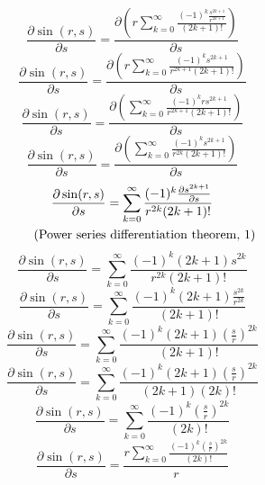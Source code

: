 \documentclass[a4paper,12pt]{report}
\newcommand{\equationnote}[1]{%
    \refstepcounter{equation}%
    \tag{#1, \theequation}%
}
\begin{document}
\begin{equation}
\frac{\partial \sin(r,s)}{\partial s} = \frac{\partial \left(r \sum \limits_{k=0}^{\infty} \frac{(-1)^k \frac{s^{2k+1}}{r^{2k+1}}}{(2k+1)!}\right)}{\partial s}
\end{equation}
\begin{equation}
\frac{\partial \sin(r,s)}{\partial s} = \frac{\partial \left(r \sum \limits_{k=0}^{\infty} \frac{(-1)^k s^{2k+1}}{r^{2k+1} (2k+1)!}\right)}{\partial s}
\end{equation}
\begin{equation}
\frac{\partial \sin(r,s)}{\partial s} = \frac{\partial \left(\sum \limits_{k=0}^{\infty} \frac{(-1)^k rs^{2k+1}}{r^{2k+1} (2k+1)!}\right)}{\partial s}
\end{equation}
\begin{equation}
\frac{\partial \sin(r,s)}{\partial s} = \frac{\partial \left(\sum \limits_{k=0}^{\infty} \frac{(-1)^k s^{2k+1}}{r^{2k} (2k+1)!}\right)}{\partial s}
\end{equation}
\begin{gather}
\frac{\partial \sin(r,s)}{\partial s} = \sum \limits_{k=0}^{\infty} \frac{(-1)^k \frac{\partial s^{2k+1}}{\partial s}}{r^{2k} (2k+1)!} \notag \\
\equationnote{Power series differentiation theorem}
\end{gather}
\begin{equation}
\frac{\partial \sin(r,s)}{\partial s} = \sum \limits_{k=0}^{\infty} \frac{(-1)^k (2k+1) s^{2k}}{r^{2k} (2k+1)!}
\end{equation}
\begin{equation}
\frac{\partial \sin(r,s)}{\partial s} = \sum \limits_{k=0}^{\infty} \frac{(-1)^k (2k+1) \frac{s^{2k}}{r^{2k}}}{(2k+1)!}
\end{equation}
\begin{equation}
\frac{\partial \sin(r,s)}{\partial s} = \sum \limits_{k=0}^{\infty} \frac{(-1)^k (2k+1) \left(\frac{s}{r}\right)^{2k}}{(2k+1)!}
\end{equation}
\begin{equation}
\frac{\partial \sin(r,s)}{\partial s} = \sum \limits_{k=0}^{\infty} \frac{(-1)^k (2k+1) \left(\frac{s}{r}\right)^{2k}}{(2k+1) (2k)!}
\end{equation}
\begin{equation}
\frac{\partial \sin(r,s)}{\partial s} = \sum \limits_{k=0}^{\infty} \frac{(-1)^k \left(\frac{s}{r}\right)^{2k}}{(2k)!}
\end{equation}
\begin{equation}
\frac{\partial \sin(r,s)}{\partial s} = \frac{r \sum \limits_{k=0}^{\infty} \frac{(-1)^k \left(\frac{s}{r}\right)^{2k}}{(2k)!}}{r}
\end{equation}
\end{document}
